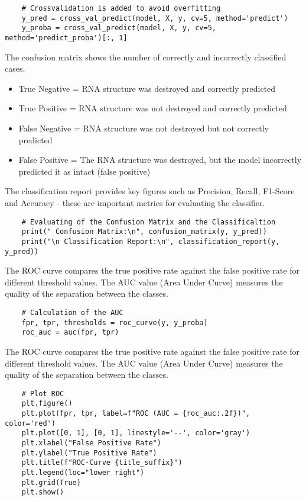 \documentclass{article}
\begin{document}
\begin{large}
\begin{large}
\begin{large}
\begin{lstlisting}
    # Crossvalidation is added to avoid overfitting
    y_pred = cross_val_predict(model, X, y, cv=5, method='predict')
    y_proba = cross_val_predict(model, X, y, cv=5, method='predict_proba')[:, 1]
\end{lstlisting}\par
\vspace{1em}
The confusion matrix shows the number of correctly and incorrectly classified cases. 


\begin{itemize}
        \item True Negative = RNA structure was destroyed and correctly predicted
        \item True Positive = RNA structure was not destroyed and correctly predicted
        \item False Negative = RNA structure was not destroyed but not correctly predicted
        \item False Positive = The RNA structure was destroyed, but the model incorrectly predicted it as intact (false positive) \\[0.5em]
\end{itemize} 

The classification report provides key figures such as Precision, Recall, F1-Score and Accuracy - these are important metrics for evaluating the classifier.
\begin{lstlisting}
    # Evaluating of the Confusion Matrix and the Classificaltion
    print(" Confusion Matrix:\n", confusion_matrix(y, y_pred))
    print("\n Classification Report:\n", classification_report(y, y_pred))
\end{lstlisting}\par
\vspace{1em}

The ROC curve compares the true positive rate against the false positive rate for different threshold values. The AUC value (Area Under Curve) measures the quality of the separation between the classes.
\begin{lstlisting}
    # Calculation of the AUC 
    fpr, tpr, thresholds = roc_curve(y, y_proba)
    roc_auc = auc(fpr, tpr)
\end{lstlisting}\par
\vspace{1em}

The ROC curve compares the true positive rate against the false positive rate for different threshold values. The AUC value (Area Under Curve) measures the quality of the separation between the classes.
\begin{lstlisting}
    # Plot ROC
    plt.figure()
    plt.plot(fpr, tpr, label=f"ROC (AUC = {roc_auc:.2f})", color='red')
    plt.plot([0, 1], [0, 1], linestyle='--', color='gray')
    plt.xlabel("False Positive Rate")
    plt.ylabel("True Positive Rate")
    plt.title(f"ROC-Curve {title_suffix}")
    plt.legend(loc="lower right")
    plt.grid(True)
    plt.show()
\end{lstlisting}\par
\vspace{1em}


\end{large}
\end{large}
\end{large}
\end{document}
